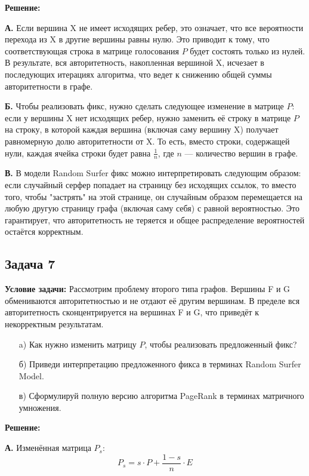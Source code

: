 \documentclass[a4paper,12pt]{article}
\begin{document}
\textbf{Решение:}

\textbf{А.} Если вершина X не имеет исходящих ребер, это означает, что все вероятности перехода из X в другие вершины равны нулю. Это приводит к тому, что соответствующая строка в матрице голосования \( P \) будет состоять только из нулей. В результате, вся авторитетность, накопленная вершиной X, исчезает в последующих итерациях алгоритма, что ведет к снижению общей суммы авторитетности в графе.

\textbf{Б.} Чтобы реализовать фикс, нужно сделать следующее изменение в матрице \( P \): если у вершины X нет исходящих ребер, нужно заменить её строку в матрице \( P \) на строку, в которой каждая вершина (включая саму вершину X) получает равномерную долю авторитетности от X. То есть, вместо строки, содержащей нули, каждая ячейка строки будет равна \( \frac{1}{n} \), где \( n \) — количество вершин в графе.

\textbf{В.} В модели Random Surfer фикс можно интерпретировать следующим образом: если случайный серфер попадает на страницу без исходящих ссылок, то вместо того, чтобы "застрять" на этой странице, он случайным образом перемещается на любую другую страницу графа (включая саму себя) с равной вероятностью. Это гарантирует, что авторитетность не теряется и общее распределение вероятностей остаётся корректным.

\subsection{Задача 7}
\textbf{Условие задачи:}
Рассмотрим проблему второго типа графов. Вершины F и G обмениваются авторитетностью и не отдают её другим вершинам. В пределе вся авторитетность сконцентрируется на вершинах F и G, что приведёт к некорректным результатам.

\begin{itemize}
    \item[a)] Как нужно изменить матрицу \( P \), чтобы реализовать предложенный фикс?
    \item[б)] Приведи интерпретацию предложенного фикса в терминах Random Surfer Model.
    \item[в)] Сформулируй полную версию алгоритма PageRank в терминах матричного умножения.
\end{itemize}

\textbf{Решение:}

\textbf{А.} Изменённая матрица \( P_s \):
\[
P_s = s \cdot P + \frac{1 - s}{n} \cdot E
\]
\end{document}
